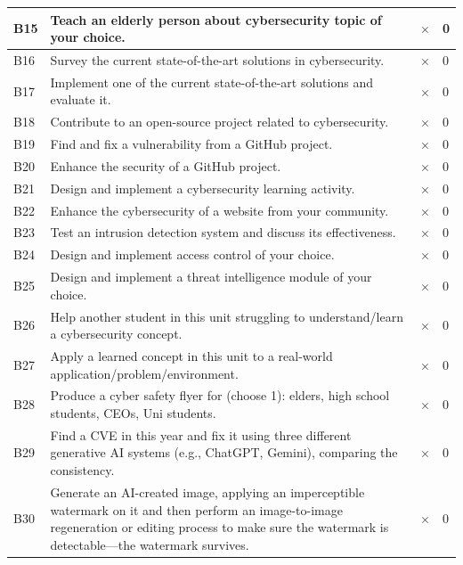 \documentclass[titlepage]{article}
\begin{document}
\begin{tabular}{ |p{4em}|p{30em}|C{6em}|C{5em}| }
            \hline
            B15 & Teach an elderly person about cybersecurity topic of your choice. & $\times$ & 0 \\
            \hline
            B16 & Survey the current state-of-the-art solutions in cybersecurity. & $\times$ & 0 \\
            \hline
            B17 & Implement one of the current state-of-the-art solutions and evaluate it. & $\times$ & 0 \\
            \hline
            B18 & Contribute to an open-source project related to cybersecurity. & $\times$ & 0 \\
            \hline
            B19 & Find and fix a vulnerability from a GitHub project. & $\times$ & 0 \\
            \hline
            B20 & Enhance the security of a GitHub project. & $\times$ & 0 \\
            \hline
            B21 & Design and implement a cybersecurity learning activity. & $\times$ & 0 \\
            \hline
            B22 & Enhance the cybersecurity of a website from your community. & $\times$ & 0 \\
            \hline
            B23 & Test an intrusion detection system and discuss its effectiveness. & $\times$ & 0 \\
            \hline
            B24 & Design and implement access control of your choice. & $\times$ & 0 \\
            \hline
            B25 & Design and implement a threat intelligence module of your choice. & $\times$ & 0 \\
            \hline
            B26 & Help another student in this unit struggling to understand/learn a cybersecurity concept. & $\times$ & 0 \\
            \hline
            B27 & Apply a learned concept in this unit to a real-world application/problem/environment. & $\times$ & 0 \\
            \hline
            B28 & Produce a cyber safety flyer for (choose 1): elders, high school students, CEOs, Uni students. & $\times$ & 0 \\
            \hline
            B29 & Find a CVE in this year and fix it using three different generative AI systems (e.g., ChatGPT, Gemini), comparing the consistency. & $\times$ & 0 \\
            \hline
            B30 & Generate an AI-created image, applying an imperceptible watermark on it and then perform an image-to-image regeneration or editing process to make sure the watermark is detectable---the watermark survives. & $\times$ & 0 \\
            \hline
        \end{tabular}
\end{document}
